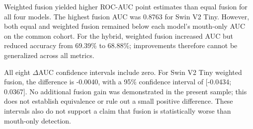 \documentclass[a4paper]{elektr}
\begin{document}
Weighted fusion yielded higher ROC-AUC point estimates than equal fusion for all four models. The highest fusion AUC was 0.8763 for Swin V2 Tiny. However, both equal and weighted fusion remained below each model's mouth-only AUC on the common cohort. For the hybrid, weighted fusion increased AUC but reduced accuracy from 69.39\% to 68.88\%; improvements therefore cannot be generalized across all metrics.

All eight $\Delta$AUC confidence intervals include zero. For Swin V2 Tiny weighted fusion, the difference is -0.0040, with a 95\% confidence interval of [-0.0434; 0.0367]. No additional fusion gain was demonstrated in the present sample; this does not establish equivalence or rule out a small positive difference. These intervals also do not support a claim that fusion is statistically worse than mouth-only detection.
\end{document}
